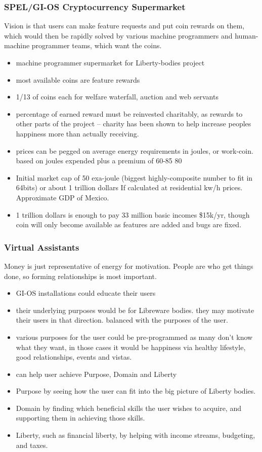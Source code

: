 \documentclass{beamer}
\begin{document}
\begin{frame}
  \frametitle{SPEL/GI-OS Cryptocurrency Supermarket}
  Vision is that users can make feature requests and put coin rewards on them, 
  which would then be rapidly solved by various machine programmers and
  human-machine programmer teams, which want the coins. 
  \begin{itemize}
    \item machine programmer supermarket for Liberty-bodies project
    \item most available coins are feature rewards
    \item 1/13 of coins each for welfare waterfall, auction and web servants
    \item percentage of earned reward must be reinvested charitably, 
          as rewards to other parts of the project -- charity has been shown to
help increase peoples happiness more than actually receiving. 
    \item prices can be pegged on average energy requirements in joules, or
          work-coin. based on joules expended plus a premium of 60-85%
          80%
    \item Initial market cap of 50 exa-joule (biggest
highly-composite number to fit in 64bits) or about 1 trillion dollars 
          If calculated at residential kw/h prices. Approximate GDP of Mexico.
    \item 1 trillion dollars is enough to pay 33 million basic incomes \$15k/yr,
          though coin will only become available as features are added and bugs
are fixed. 
  \end{itemize}
\end{frame}

\begin{frame}
  \frametitle{Virtual Assistants}
  Money is just representative of energy for motivation. People are who get
things done, so forming relationships is most important. 
  \begin{itemize}
    \item GI-OS installations could educate their users
    \item their underlying purposes would be for Libreware bodies.
    they may motivate their users in that direction. 
    balanced with the purposes of the user. 
    \item various purposes for the user could be pre-programmed as many don't know
what they want, in those cases it would be happiness via healthy lifestyle, 
    good relationships, events and vistas.   
    \item can help user achieve Purpose, Domain and Liberty
    \item Purpose by seeing how the user can fit into the big picture of Liberty
bodies. 
    \item Domain by finding which beneficial skills the user wishes to acquire,
      and supporting them in achieving those skills. 
    \item Liberty, such as financial liberty, by helping with income streams, 
          budgeting, and taxes.
  \end{itemize}
\end{frame}
\end{document}
